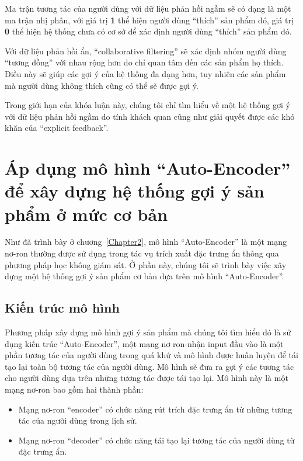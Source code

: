    Ma trận tương tác của người dùng với dữ liệu phản hồi ngầm sẽ có dạng là một ma trận nhị phân, với giá trị \textbf{1} 
    thể hiện người dùng ``thích'' sản phẩm đó, giá trị \textbf{0} thể hiện hệ thống chưa có cơ sở để xác định người dùng ``thích'' sản phẩm đó.

    Với dữ liệu phản hồi ẩn, ``collaborative filtering'' sẽ xác định nhóm người dùng ``tương đồng'' với nhau rộng hơn
    do chỉ quan tâm đến các sản phẩm họ thích. Điều này sẽ giúp các gợi ý của hệ thống 
    đa dạng hơn, tuy nhiên các sản phẩm mà người dùng không thích cũng có thể sẽ được gợi ý.

    Trong giới hạn của khóa luận này, chúng tôi chỉ tìm hiểu về một hệ thống gợi ý với dữ liệu phản hồi ngầm do tính khách quan
    cũng như giải quyết được các khó khăn của ``explicit feedback''.

\section{Áp dụng mô hình ``Auto-Encoder'' để xây dựng hệ thống gợi ý sản phẩm ở mức cơ bản}
    Như đã trình bày ở chương~\ref{Chapter2}, mô hình ``Auto-Encoder'' là một mạng nơ-ron thường được sử dụng trong tác vụ trích xuất đặc trưng ẩn thông qua phương pháp học không giám sát.
    Ở phần này, chúng tôi sẽ trình bày việc xây dựng một hệ thống gợi ý sản phẩm cơ bản dựa trên mô hình ``Auto-Encoder''.

    \subsection{Kiến trúc mô hình}
    \label{chap3/sec11}
    Phương pháp xây dựng mô hình gợi ý sản phẩm mà chúng tôi tìm hiểu đó là sử dụng kiến trúc ``Auto-Encoder'', một mạng nơ ron-nhận input đầu vào là một phần tương tác của người dùng trong quá khứ và mô hình được huấn luyện để tái tạo lại toàn bộ tương tác của người dùng. 
    Mô hình sẽ đưa ra gợi ý các tương tác cho người dùng dựa trên những tương tác được tái tạo lại.
    Mô hình này là một mạng nơ-ron bao gồm hai thành phần:
    \begin{itemize}
        \item Mạng nơ-ron ``encoder'' có chức năng rút trích đặc trưng ẩn từ những tương tác của người dùng trong lịch sử.
        \item Mạng nơ-ron ``decoder'' có chức năng tái tạo lại tương tác của người dùng từ đặc trưng ẩn.
    \end{itemize}

